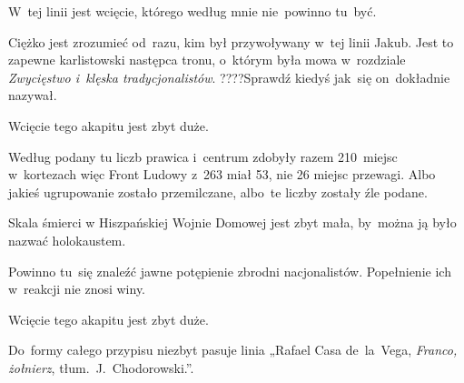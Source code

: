 \documentclass[a4paper,11pt]{article}
\numberwithin{equation}{section}
\begin{document}
\VerSpaceFour





\noindent
{} W~tej linii jest wcięcie, którego według mnie
nie~powinno tu~być.

\VerSpaceFour





\noindent
{} Ciężko jest zrozumieć od~razu, kim był przywoływany
w~tej linii Jakub. Jest to zapewne karlistowski następca tronu, o~którym
była mowa w~rozdziale \textit{Zwycięstwo i~klęska tradycjonalistów}.
????Sprawdź kiedyś jak~się on~dokładnie nazywał.

\VerSpaceFour





\noindent
{} Wcięcie tego akapitu jest zbyt duże.

\VerSpaceFour





\noindent
{} Według podany tu liczb prawica i~centrum zdobyły razem 210~miejsc
w~kortezach więc Front Ludowy z~263 miał 53, nie 26 miejsc przewagi. Albo
jakieś ugrupowanie zostało przemilczane, albo~te liczby zostały źle podane.

\VerSpaceFour





\noindent
{} Skala śmierci w Hiszpańskiej Wojnie Domowej jest zbyt
mała, by~można ją było nazwać holokaustem.

\VerSpaceFour





\noindent
{} Powinno tu~się znaleźć jawne potępienie zbrodni
nacjonalistów. Popełnienie ich w~reakcji nie znosi winy.

\VerSpaceFour





\noindent
{} Wcięcie tego akapitu jest zbyt duże.

\VerSpaceFour





\noindent
{} Do~formy całego przypisu niezbyt pasuje linia „Rafael
Casa de~la~Vega, \textit{Franco, żołnierz}, tłum.~J.~Chodorowski.”.
\end{document}

